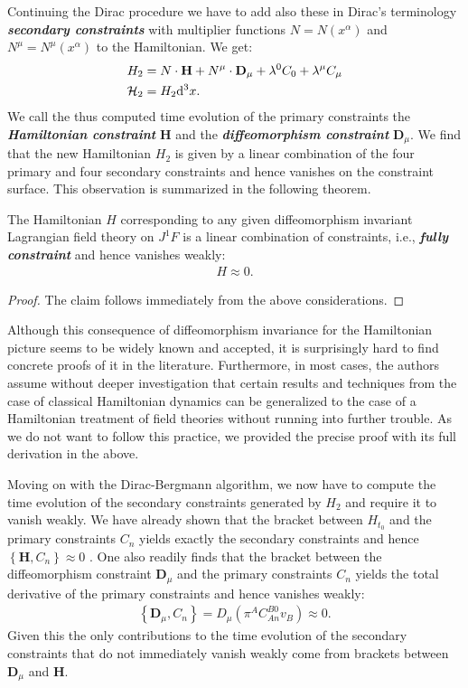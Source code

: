 Continuing the Dirac procedure we have to add also these in Dirac's terminology \textit{\textbf{secondary constraints}} with multiplier functions $N=N(x^{\alpha})$ and $N^{\mu}= N^{\mu}(x^{\alpha})$ to the Hamiltonian. We get:
\begin{align}
\begin{aligned}
H_{2} &= N \cdot \mathbf{H} + N^{\mu} \cdot \mathbf{D}_{\mu} + \lambda^0 C_0 + \lambda^{\mu}C_{\mu}\\
\smallskip
\mathcal{H}_2 &= H_2 \mathrm{d}^3x.
\end{aligned}
\end{align}
We call the thus computed time evolution of the primary constraints the \textit{\textbf{Hamiltonian constraint}} $\mathbf{H}$ and the \textit{\textbf{diffeomorphism constraint}} $\mathbf{D}_{\mu}$.
We find that the new Hamiltonian $H_{2}$ is given by a linear combination of the four primary and four secondary constraints and hence vanishes on the constraint surface. This observation is summarized in the following theorem.
\begin{theorem}
The Hamiltonian $H$ corresponding to any given diffeomorphism invariant Lagrangian field theory on $J^1F$ is a linear combination of constraints, i.e., \textbf{\textit{fully constraint}} and hence vanishes weakly:
\begin{align}
   H \approx 0.
\end{align}
\end{theorem}
\begin{proof}
The claim follows immediately from the above considerations.
\end{proof}
\begin{remark}
Although this consequence of diffeomorphism invariance for the Hamiltonian picture seems to be widely known and accepted, it is surprisingly hard to find concrete proofs of it in the literature. Furthermore, in most cases, the authors assume without deeper investigation that certain results and techniques from the case of classical Hamiltonian dynamics can be generalized to the case of a Hamiltonian treatment of field theories without running into further trouble. As we do not want to follow this practice, we provided the precise proof with its full derivation in the above.
\end{remark}

Moving on with the Dirac-Bergmann algorithm, we now have to compute the time evolution of the secondary constraints generated by $H_2$ and require it to vanish weakly. We have already shown that the bracket between $H_{t_0}$ and the primary constraints $C_n$ yields exactly the secondary constraints and hence $\left \{\mathbf{H}, C_n \right \} \approx 0$  . One also readily finds that the bracket between the diffeomorphism constraint $\mathbf{D}_{\mu}$ and the primary constraints $C_n$ yields the total derivative of the primary constraints and hence vanishes weakly:
\begin{align}
    \left \{\mathbf{D}_{\mu}, C_n \right \} = D_{\mu} (\pi^A C_{An}^{B0}v_B) \approx 0.
\end{align}
Given this the only contributions to the time evolution of the secondary constraints that do not immediately vanish weakly come from brackets between $\mathbf{D}_{\mu}$ and $\mathbf{H}$. 


